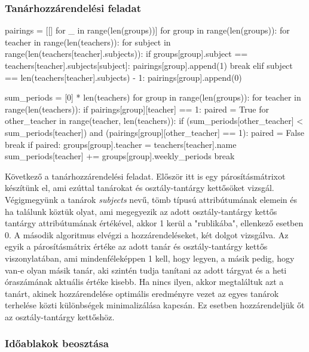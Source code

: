 \documentclass[a4paper,12pt]{article}
\begin{document}
\subsubsection{Tanárhozzárendelési feladat}

\begin{python}
pairings = [[] for _ in range(len(groups))]
for group in range(len(groups)):
    for teacher in range(len(teachers)):
        for subject in range(len(teachers[teacher].subjects)):
            if groups[group].subject == teachers[teacher].subjects[subject]:
                pairings[group].append(1)
                break
            elif subject == len(teachers[teacher].subjects) - 1:
                pairings[group].append(0)

sum_periods = [0] * len(teachers)
for group in range(len(groups)):
    for teacher in range(len(teachers)):
        if pairings[group][teacher] == 1:
            paired = True
            for other_teacher in range(teacher, len(teachers)):
                if (sum_periods[other_teacher] < sum_periods[teacher]) and (pairings[group][other_teacher] == 1):
                    paired = False
                    break
            if paired:
                groups[group].teacher = teachers[teacher].name
                sum_periods[teacher] += groups[group].weekly_periods
                break
\end{python}

Következő a tanárhozzárendelési feladat. Először itt is egy párosításmátrixot készítünk el, ami ezúttal tanárokat és osztály-tantárgy kettősöket vizsgál. Végigmegyünk a tanárok \textsl{subjects} nevű, tömb típusú attribútumának elemein és ha találunk köztük olyat, ami megegyezik az adott osztály-tantárgy kettős tantárgy attribútumának értékével, akkor 1 kerül a "rublikába", ellenkező esetben 0.
A második algoritmus elvégzi a hozzárendeléseket, két dolgot vizsgálva. Az egyik a párosításmátrix értéke az adott tanár és osztály-tantárgy kettős viszonylatában, ami mindenféleképpen 1 kell, hogy legyen, a másik pedig, hogy van-e olyan másik tanár, aki szintén tudja tanítani az adott tárgyat és a heti óraszámának aktuális értéke kisebb. Ha nincs ilyen, akkor megtaláltuk azt a tanárt, akinek hozzárendelése optimális eredményre vezet az egyes tanárok terhelése közti különbségek minimalizálása kapcsán. Ez esetben hozzárendeljük őt az osztály-tantárgy kettőshöz.

\subsubsection{Időablakok beosztása}
\end{document}
